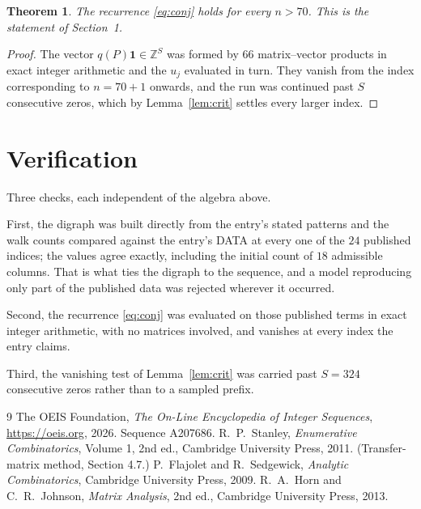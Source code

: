 \documentclass[11pt,a4paper]{article}
\theoremstyle{plain}
\newtheorem{theorem}{Theorem}
\theoremstyle{definition}
\begin{document}
\begin{theorem}
The recurrence \eqref{eq:conj} holds for every $n>70$. This is the statement of
Section~1.
\end{theorem}

\begin{proof}
The vector $q(P)\mathbf{1}\in\mathbb{Z}^{S}$ was formed by $66$ matrix--vector
products in exact integer arithmetic and the $u_j$ evaluated in turn. They vanish from the
index corresponding to $n=70+1$ onwards, and the run was continued past $S$ consecutive
zeros, which by Lemma~\ref{lem:crit} settles every larger index.
\end{proof}

\section{Verification}

Three checks, each independent of the algebra above.

First, the digraph was built directly from the entry's stated patterns and the walk counts
compared against the entry's DATA at every one of the $24$ published indices; the
values agree exactly, including the initial count of $18$ admissible columns. That is
what ties the digraph to the sequence, and a model reproducing only part of the published
data was rejected wherever it occurred.

Second, the recurrence \eqref{eq:conj} was evaluated on those published terms in exact
integer arithmetic, with no matrices involved, and vanishes at every index the entry claims.

Third, the vanishing test of Lemma~\ref{lem:crit} was carried past $S=324$ consecutive
zeros rather than to a sampled prefix.

\begin{thebibliography}{9}
 The OEIS Foundation, \emph{The On-Line Encyclopedia of Integer
Sequences}, \url{https://oeis.org}, 2026. Sequence A207686.
 R.~P.~Stanley, \emph{Enumerative Combinatorics}, Volume 1, 2nd ed.,
Cambridge University Press, 2011. (Transfer-matrix method, Section 4.7.)
 P.~Flajolet and R.~Sedgewick, \emph{Analytic Combinatorics}, Cambridge
University Press, 2009.
 R.~A.~Horn and C.~R.~Johnson, \emph{Matrix Analysis}, 2nd ed., Cambridge
University Press, 2013.
\end{thebibliography}
\end{document}
